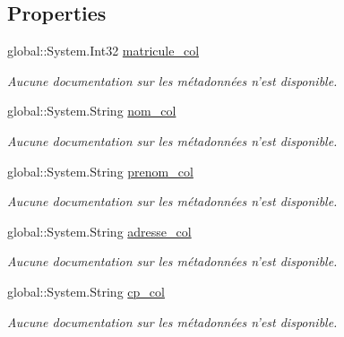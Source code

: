 \subsection*{Properties}
\begin{DoxyCompactItemize}
\item 
global\-::\-System.\-Int32 \hyperlink{class_model_1_1_c_o_l_l_a_b_o_r_a_t_e_u_r_a1d528bb5e6dab9aee87ec0498efce970}{matricule\-\_\-col}
\begin{DoxyCompactList}\small\item\em Aucune documentation sur les métadonnées n'est disponible. \end{DoxyCompactList}\item 
global\-::\-System.\-String \hyperlink{class_model_1_1_c_o_l_l_a_b_o_r_a_t_e_u_r_a16da434fc2d5fd237a9c10011c7240ad}{nom\-\_\-col}
\begin{DoxyCompactList}\small\item\em Aucune documentation sur les métadonnées n'est disponible. \end{DoxyCompactList}\item 
global\-::\-System.\-String \hyperlink{class_model_1_1_c_o_l_l_a_b_o_r_a_t_e_u_r_a653654accc486107577cbe805db1e1dc}{prenom\-\_\-col}
\begin{DoxyCompactList}\small\item\em Aucune documentation sur les métadonnées n'est disponible. \end{DoxyCompactList}\item 
global\-::\-System.\-String \hyperlink{class_model_1_1_c_o_l_l_a_b_o_r_a_t_e_u_r_a3a3c271af8a2fa7f9d2d8f5600fb8e56}{adresse\-\_\-col}
\begin{DoxyCompactList}\small\item\em Aucune documentation sur les métadonnées n'est disponible. \end{DoxyCompactList}\item 
global\-::\-System.\-String \hyperlink{class_model_1_1_c_o_l_l_a_b_o_r_a_t_e_u_r_a264f8faf4646f7748ff732d79a4e54fd}{cp\-\_\-col}
\begin{DoxyCompactList}\small\item\em Aucune documentation sur les métadonnées n'est disponible. \end{DoxyCompactList}\item 

\end{DoxyCompactItemize}
